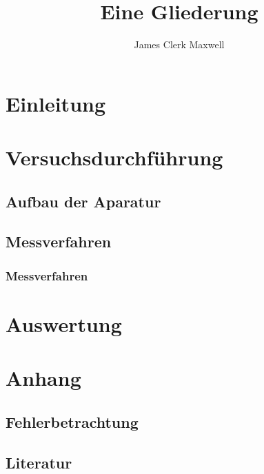 \documentclass[a4paper,10pt]{article}
\title{Eine Gliederung}
\author{James Clerk Maxwell}
\begin{document}
    \maketitle

    \section{Einleitung}
    \section{Versuchsdurchführung}
    \subsection{Aufbau der Aparatur}
    \subsection{Messverfahren}
    \subsubsection{Messverfahren}
    
    \section{Auswertung}
    \section{Anhang}
    \subsection{Fehlerbetrachtung}
    \subsection{Literatur}
\end{document}

